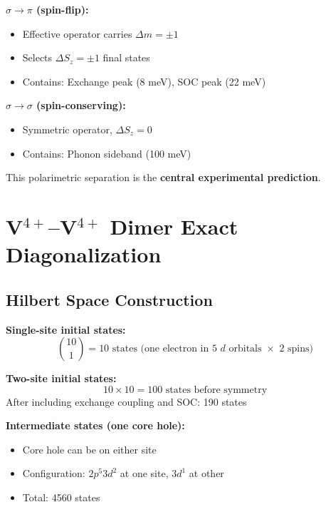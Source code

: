 \documentclass[11pt,letterpaper]{article}
\begin{document}
\begin{keyresult}[title={Channel Separation}]
\textbf{$\sigma \to \pi$ (spin-flip):}
\begin{itemize}
    \item Effective operator carries $\Delta m = \pm 1$
    \item Selects $\Delta S_z = \pm 1$ final states
    \item Contains: Exchange peak (8 meV), SOC peak (22 meV)
\end{itemize}

\textbf{$\sigma \to \sigma$ (spin-conserving):}
\begin{itemize}
    \item Symmetric operator, $\Delta S_z = 0$
    \item Contains: Phonon sideband (100 meV)
\end{itemize}

This polarimetric separation is the \textbf{central experimental prediction}.
\end{keyresult}

\section{V$^{4+}$--V$^{4+}$ Dimer Exact Diagonalization}

\subsection{Hilbert Space Construction}

\begin{derivation}[title={State Counting}]
\textbf{Single-site initial states:}
\begin{equation}
\binom{10}{1} = 10 \text{ states (one electron in 5 $d$ orbitals $\times$ 2 spins)}
\end{equation}

\textbf{Two-site initial states:}
\begin{equation}
10 \times 10 = 100 \text{ states before symmetry}
\end{equation}
After including exchange coupling and SOC: 190 states

\textbf{Intermediate states (one core hole):}
\begin{itemize}
    \item Core hole can be on either site
    \item Configuration: $2p^5 3d^2$ at one site, $3d^1$ at other
    \item Total: 4560 states
\end{itemize}
\end{derivation}
\end{document}
